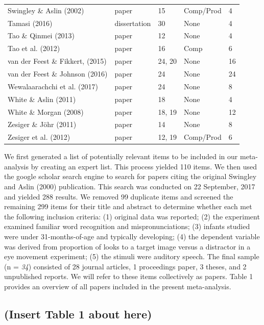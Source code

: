 \documentclass[man]{apa6}
\newenvironment{lltable}{\begin{landscape}\begin{center}\begin{ThreePartTable}}{\end{ThreePartTable}\end{center}\end{landscape}}
\theoremstyle{definition}
\theoremstyle{definition}
\theoremstyle{definition}
\theoremstyle{remark}
\begin{document}
\begin{lltable}
\begin{longtable}{lllll}
Swingley \& Aslin (2002) & paper & 15 & Comp/Prod & 4\\
Tamasi (2016) & dissertation & 30 & None & 4\\
Tao \& Qinmei (2013) & paper & 12 & None & 4\\
Tao et al. (2012) & paper & 16 & Comp & 6\\
van der Feest \& Fikkert, (2015) & paper & 24, 20 & None & 16\\
van der Feest \& Johnson (2016) & paper & 24 & None & 24\\
Wewalaarachchi et al. (2017) & paper & 24 & None & 8\\
White \& Aslin (2011) & paper & 18 & None & 4\\
White \& Morgan (2008) & paper & 18, 19 & None & 12\\
Zesiger \& Jöhr (2011) & paper & 14 & None & 8\\
Zesiger et al. (2012) & paper & 12, 19 & Comp/Prod & 6\\
\bottomrule
\end{longtable}
\end{lltable}

We first generated a list of potentially relevant items to be included
in our meta-analysis by creating an expert list. This process yielded
110 items. We then used the google scholar search engine to search for
papers citing the original Swingley and Aslin (2000) publication. This
search was conducted on 22 September, 2017 and yielded 288 results. We
removed 99 duplicate items and screened the remaining 299 items for
their title and abstract to determine whether each met the following
inclusion criteria: (1) original data was reported; (2) the experiment
examined familiar word recognition and mispronunciations; (3) infants
studied were under 31-months-of-age and typically developing; (4) the
dependent variable was derived from proportion of looks to a target
image versus a distractor in a eye movement experiment; (5) the stimuli
were auditory speech. The final sample (n = \emph{34}) consisted of 28
journal articles, 1 proceedings paper, 3 theses, and 2 unpublished
reports. We will refer to these items collectively as papers. Table 1
provides an overview of all papers included in the present
meta-analysis.

\subsection{(Insert Table 1 about
here)}\label{insert-table-1-about-here}
\end{document}
